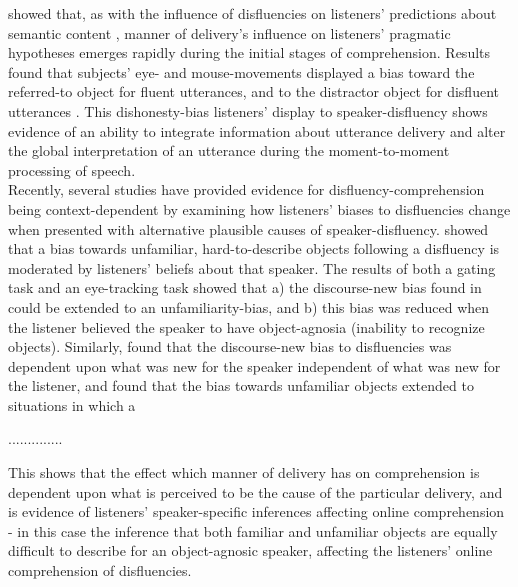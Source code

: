 \documentclass[man]{apa6}
\begin{document}
\citet{Loy2016} showed that, as with the influence of disfluencies on listeners' predictions about semantic content \citep{Arnold2004, Arnold2007, Barr2001}, manner of delivery's influence on listeners' pragmatic hypotheses emerges rapidly during the initial stages of comprehension. 
Results found that subjects' eye- and mouse-movements displayed a bias toward the referred-to object for fluent utterances, and to the distractor object for disfluent utterances \citep{Loy2016}.
This dishonesty-bias listeners' display to speaker-disfluency shows evidence of an ability to integrate information about utterance delivery and alter the global interpretation of an utterance during the moment-to-moment processing of speech.\\







Recently, several studies have provided evidence for disfluency-comprehension being context-dependent by examining how listeners' biases to disfluencies change when presented with alternative plausible causes of speaker-disfluency. 
\citet{Arnold2007} showed that a bias towards unfamiliar, hard-to-describe objects following a disfluency is moderated by listeners' beliefs about that speaker. 
The results of both a gating task and an eye-tracking task showed that a) the discourse-new bias found in \citet{Arnold2004} could be extended to an unfamiliarity-bias, and b) this bias was reduced when the listener believed the speaker to have object-agnosia (inability to recognize objects). 
Similarly, \citet{Barr2010} found that the discourse-new bias to disfluencies was dependent upon what was new for the speaker independent of what was new for the listener, and \citet{Heller2015} found that the bias towards unfamiliar objects extended to situations in which a


..............


This shows that the effect which manner of delivery has on comprehension is dependent upon what is perceived to be the cause of the particular delivery, and is evidence of listeners' speaker-specific inferences affecting online comprehension - in this case the inference that both familiar and unfamiliar objects are equally difficult to describe for an object-agnosic speaker, affecting the listeners' online comprehension of disfluencies.\\
\end{document}
